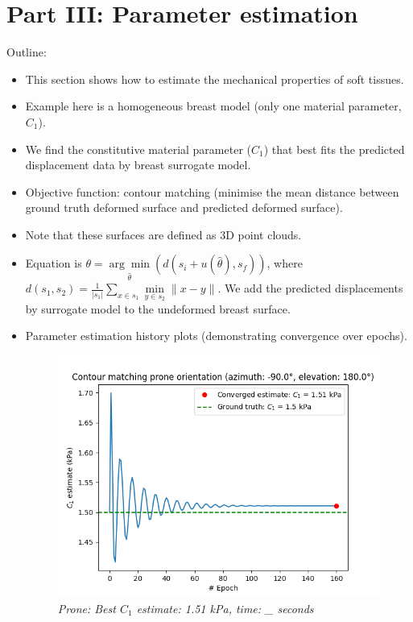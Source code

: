 \documentclass[11pt]{article}
\begin{document}
\pagebreak

\section{Part III: Parameter estimation}

Outline:
\begin{itemize}
    \item This section shows how to estimate the mechanical properties of soft tissues. 
    \item Example here is a homogeneous breast model (only one material parameter, $C_1$). 
    \item We find the constitutive material parameter ($C_1$) that best fits the predicted displacement data by breast surrogate model. 
    \item Objective function: contour matching (minimise the mean distance between ground truth deformed surface and predicted deformed surface). 
    \item Note that these surfaces are defined as 3D point clouds. 
    \item Equation is $\theta = \underset{\hat{\theta}}{\arg\min}(d(s_{i} + u(\hat{\theta}), s_{f}))$, where $ d(s_1, s_2) = \frac{1}{|s_1|}\sum_{x \in s_{1}} \underset{y \in s_{2}}{\min} \lVert x-y \rVert $. We add the predicted displacements by surrogate model to the undeformed breast surface. 
    \item Parameter estimation history plots (demonstrating convergence over epochs). 
        \begin{figure}
            \centering
            \includegraphics[scale=0.8]{Images/breast/parameter_estimation/prone_parameter_estimate.png}
            \caption{\textit{\label{fig10}Prone: Best $C_1$ estimate: 1.51 kPa, time: \_ seconds}}
        \end{figure}


\end{itemize}
\end{document}
